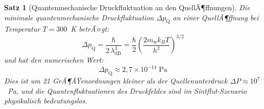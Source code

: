 ﻿\documentclass[12pt,a4paper]{report}
\newtheorem{theorem}{Satz}[chapter]
\begin{document}
\begin{theorem}[Quantenmechanische Druckfluktuation an den QuellÃ¶ffnungen]
	\label{thm:druckfluktuation}
	Die minimale quantenmechanische Druckfluktuation $\Delta p_\mathrm{Q}$ an einer QuellÃ¶ffnung bei Temperatur $T = 300$~K betrÃ¤gt:
	\begin{equation}
		\Delta p_\mathrm{Q} = \frac{\hbar}{2\,\lambda_\mathrm{dB}^3} = \frac{\hbar}{2}\left(\frac{2m_\mathrm{w}k_BT}{h^2}\right)^{3/2}
		\label{eq:delta_p_quanten}
	\end{equation}
	und hat den numerischen Wert:
	\begin{equation}
		\Delta p_\mathrm{Q} \approx 2{,}7\times10^{-14}\;\text{Pa}
		\label{eq:delta_p_numerisch}
	\end{equation}
	Dies ist um 21 GrÃ¶ÃŸenordnungen kleiner als der Quellenunterdruck $\Delta P \approx 10^7$~Pa, und die Quantenfluktuationen des Druckfeldes sind im Sintflut-Szenario physikalisch bedeutungslos.
\end{theorem}
\end{document}
